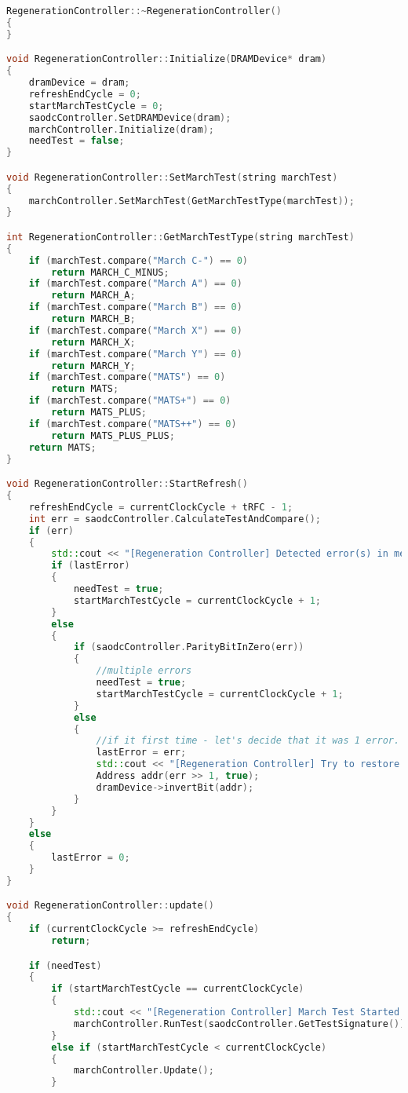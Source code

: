 \begin{lstlisting}[language=C++, style=cplusplusstyle]
RegenerationController::~RegenerationController()
{
}

void RegenerationController::Initialize(DRAMDevice* dram)
{
	dramDevice = dram;
    refreshEndCycle = 0;
	startMarchTestCycle = 0;
	saodcController.SetDRAMDevice(dram);
	marchController.Initialize(dram);
	needTest = false;
}

void RegenerationController::SetMarchTest(string marchTest)
{
	marchController.SetMarchTest(GetMarchTestType(marchTest));
}

int RegenerationController::GetMarchTestType(string marchTest)
{
	if (marchTest.compare("March C-") == 0)
		return MARCH_C_MINUS;
	if (marchTest.compare("March A") == 0)
		return MARCH_A;
	if (marchTest.compare("March B") == 0)
		return MARCH_B;
	if (marchTest.compare("March X") == 0)
		return MARCH_X;
	if (marchTest.compare("March Y") == 0)
		return MARCH_Y;
	if (marchTest.compare("MATS") == 0)
		return MATS;
	if (marchTest.compare("MATS+") == 0)
		return MATS_PLUS;
	if (marchTest.compare("MATS++") == 0)
		return MATS_PLUS_PLUS;
	return MATS;
}

void RegenerationController::StartRefresh()
{
	refreshEndCycle = currentClockCycle + tRFC - 1;
    int err = saodcController.CalculateTestAndCompare();
    if (err)
	{
        std::cout << "[Regeneration Controller] Detected error(s) in memory.\n      Signature Sum = " << err << "(" << addrTranslator.GetDescription(err>>1, true) << ")" << std::endl;
        if (lastError)
        {
            needTest = true;
            startMarchTestCycle = currentClockCycle + 1;
        }
        else
        {
			if (saodcController.ParityBitInZero(err))
			{
				//multiple errors
				needTest = true;
				startMarchTestCycle = currentClockCycle + 1;
			}
			else
			{
				//if it first time - let's decide that it was 1 error. Invert bit
				lastError = err;
				std::cout << "[Regeneration Controller] Try to restore the damaged cell." << std::endl;
				Address addr(err >> 1, true);
				dramDevice->invertBit(addr);
			}
        }		
	}
    else
    {
        lastError = 0;
    }
}

void RegenerationController::update()
{
	if (currentClockCycle >= refreshEndCycle)
		return;

	if (needTest)
	{
		if (startMarchTestCycle == currentClockCycle)
		{
            std::cout << "[Regeneration Controller] March Test Started." << std::endl;
            marchController.RunTest(saodcController.GetTestSignature());
		}
		else if (startMarchTestCycle < currentClockCycle)
		{
			marchController.Update();
		}


\end{lstlisting}
